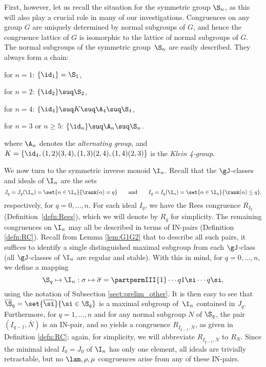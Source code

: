 First, however, let us recall the situation for the symmetric group $\S_n$, as this will also play a crucial role in many of our investigations.
Congruences on any group $G$ are uniquely determined by normal subgroups of $G$,
and hence the congruence lattice of $G$ is isomorphic to the lattice of normal subgroups of $G$.
The normal subgroups of the symmetric group~$\S_n$ are easily described.  They
always form a chain:
\begin{itemize}\begin{multicols}{2}
\item for $n=1$: $\{\id_1\}=\S_1$,
\item for $n=2$: $\{\id_2\}\suq\S_2$,
\item for $n=4$: $\{\id_4\}\suq K\suq\A_4\suq\S_4$,
\item for $n=3$ or $n\geq5$: $\{\id_n\}\suq\A_n\suq\S_n$.
\end{multicols}\end{itemize}
where $\A_n$ denotes the \emph{alternating group}, and
$K=\{\id_4,(1,2)(3,4),(1,3)(2,4),(1,4)(2,3)\}$ is the \emph{Klein 4-group}.



We now turn to the symmetric inverse monoid $\I_n$.
Recall that the $\gJ$-classes and ideals of $\I_n$ are the sets
\[
J_q=J_q(\I_n)=\set{\alpha\in\I_n}{\rank(\alpha)=q} \qquad\text{and}\qquad I_q=I_q(\I_n)=\set{\alpha\in\I_n}{\rank(\alpha)\leq q},
\]
respectively, for $q=0,\ldots,n$.
For each ideal $I_q$, we have the Rees congruence $R_{I_q}$ (Definition~\ref{defn:Rees}), which we will denote by $R_q$ for simplicity.
%
The remaining congruences on $\I_n$ may all be described in terms of IN-pairs (Definition \ref{defn:RC}).  Recall from Lemma \ref{lem:G1G2} that to describe all such pairs, it suffices to identify a single distinguished maximal subgroup from each $\gJ$-class (all $\gJ$-classes of $\I_n$ are regular and stable).  With this in mind, for $q=0,\dots,n$, we define a mapping
\[
\S_q\mapsto \I_n:\sigma\mapsto\overline{\sigma}=\partpermIII{1}\cdots{q}{{1\si}}\cdots{{q\si}},
\]
using the notation of Subsection \ref{sect:prelim_other}.
It is then easy to see that $\overline{\S}_q=\set{\overline\si}{\si\in\S_q}$ is a maximal subgroup of~$\I_n$ contained in $J_q$.
Furthermore, for $q=1,\ldots,n$ and for any normal subgroup $N$ of $\S_q$, the pair $(I_{q-1},\overline N)$ is an IN-pair, and so yields a congruence $R_{I_{q-1},\overline N}$, as given in Definition \ref{defn:RC}; again, for simplicity, we will abbreviate $R_{I_{q-1},\overline N}$ to $R_N$.  Since the minimal ideal $I_0=J_0$ of $\I_n$ has only one element, all ideals are trivially retractable, but no $\lam,\rho,\mu$ congruences arise from any of these IN-pairs.

